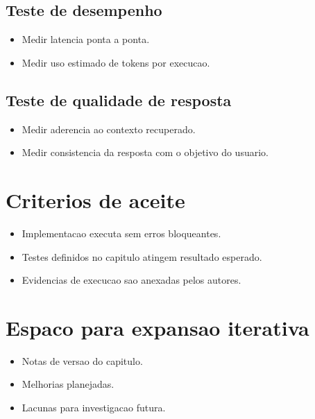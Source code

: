 \subsection{Teste de desempenho}
\begin{itemize}[leftmargin=*]
  \item Medir latencia ponta a ponta.
  \item Medir uso estimado de tokens por execucao.
\end{itemize}

\subsection{Teste de qualidade de resposta}
\begin{itemize}[leftmargin=*]
  \item Medir aderencia ao contexto recuperado.
  \item Medir consistencia da resposta com o objetivo do usuario.
\end{itemize}

\section{Criterios de aceite}
\begin{itemize}[leftmargin=*]
  \item Implementacao executa sem erros bloqueantes.
  \item Testes definidos no capitulo atingem resultado esperado.
  \item Evidencias de execucao sao anexadas pelos autores.
\end{itemize}

\section{Espaco para expansao iterativa}
\begin{itemize}[leftmargin=*]
  \item Notas de versao do capitulo.
  \item Melhorias planejadas.
  \item Lacunas para investigacao futura.
\end{itemize}
